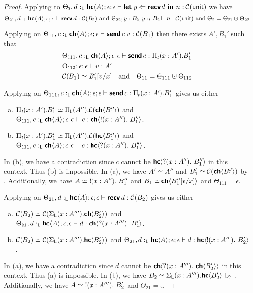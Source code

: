 \begin{proof}
  \noindent
  Applying  to
  $\Theta_2, d :_{\textsf{L}} {\textbf{\textsf{hc}}\langle{A}\rangle} ; \epsilon ; \epsilon \vdash \textbf{\textsf{let}}\;{y}\Leftarrow{\textbf{\textsf{recv}}\,{d}}\textbf{\textsf{ in }}{n} : \mathcal{C}({\textsf{unit}})$
  we have
  $$
    \Theta_{21}, d \tL \HC{A} ; \epsilon ; \epsilon \vdash \recvR{d} : \CM{B_2}
    \text{ and }
    \Theta_{22}  ; y : B_2 ; y :_t B_2 \vdash n : \CM{\unit}
    \text{ and } {\Theta_2 = \Theta_{21} \dotcup \Theta_{22}}
  $$

  \noindent
  Applying  on
  $\Theta_{11}, c :_{\textsf{L}} {\textbf{\textsf{ch}}\langle{A}\rangle} ; \epsilon ; \epsilon \vdash {\textbf{\textsf{send}}\,{c}}\;{v} : \mathcal{C}({B_1})$
  then there exists $A', B_1'$ such that
  \begin{align*}
    & \Theta_{111}, c \tL \CH{A} ; \epsilon ; \epsilon \vdash \sendR{c} : \PiR{t}{x : A'}{B_1'} \\
    & \Theta_{112} ; \epsilon ; \epsilon \vdash v : A' \\
    & \CM{B_1} \simeq B_1'[v/x] \quad\text{and}\quad \Theta_{11} = \Theta_{111} \dotcup \Theta_{112}
  \end{align*}

  \noindent
  Applying  on
  $\Theta_{111}, c :_{\textsf{L}} {\textbf{\textsf{ch}}\langle{A}\rangle} ; \epsilon ; \epsilon \vdash \textbf{\textsf{send}}\,{c} : \Pi_{t}({x : A'}).{B_1'}$
  gives us either
  \begin{enumerate}[(a)]
    \item $\Pi_{t}({x : A'}).{B_1'} \simeq \Pi_{\textsf{L}}({A''}).{\mathcal{C}({{\textbf{\textsf{ch}}\langle{B_1''}\rangle}})}$ and
          $\Theta_{111}, c :_{\textsf{L}} {\textbf{\textsf{ch}}\langle{A}\rangle} ; \epsilon ; \epsilon \vdash c : {\textbf{\textsf{ch}}\langle{{{!}({x : A''}).\ {B_1''}}}\rangle}$.
    \item $\Pi_{t}({x : A'}).{B_1'} \simeq \Pi_{\textsf{L}}({A''}).{\mathcal{C}({{\textbf{\textsf{hc}}\langle{B_1''}\rangle}})}$ and
          $\Theta_{111}, c :_{\textsf{L}} {\textbf{\textsf{ch}}\langle{A}\rangle} ; \epsilon ; \epsilon \vdash c : {\textbf{\textsf{hc}}\langle{{{?}({x : A''}).\ {B_1''}}}\rangle}$.
  \end{enumerate}
  In (b), we have a contradiction since $c$ cannot be ${\textbf{\textsf{hc}}\langle{{{?}({x : A''}).\ {B_1''}}}\rangle}$ in this context.
  Thus (b) is impossible. In (a), we have $A' \simeq A''$ and $B_1' \simeq \mathcal{C}({{\textbf{\textsf{ch}}\langle{B_1''}\rangle}})$ by .
  Additionally, we have $A \simeq {{!}({x : A''}).\ {B_1''}}$ and $B_1 \simeq {\textbf{\textsf{ch}}\langle{B_1''[v/x]}\rangle}$ and $\Theta_{111} = \epsilon$.

  \noindent
  Applying  on
  $\Theta_{21}, d :_{\textsf{L}} {\textbf{\textsf{hc}}\langle{A}\rangle} ; \epsilon ; \epsilon \vdash \textbf{\textsf{recv}}\,{d} : \mathcal{C}({B_2})$
  gives us either
  \begin{enumerate}[(a)]
    \item $\mathcal{C}({B_2}) \simeq \mathcal{C}({\Sigma_{\textsf{L}}({x : A'''}).{{\textbf{\textsf{ch}}\langle{B_2'}\rangle}}})$ and
          $\Theta_{21}, d :_{\textsf{L}} {\textbf{\textsf{hc}}\langle{A}\rangle} ; \epsilon ; \epsilon \vdash d : {\textbf{\textsf{ch}}\langle{{{?}({x : A'''}).\ {B_2'}}}\rangle}$.
    \item $\mathcal{C}({B_2}) \simeq \mathcal{C}({\Sigma_{\textsf{L}}({x : A'''}).{{\textbf{\textsf{hc}}\langle{B_2'}\rangle}}})$ and
          $\Theta_{21}, d :_{\textsf{L}} {\textbf{\textsf{hc}}\langle{A}\rangle} ; \epsilon ; \epsilon \vdash d : {\textbf{\textsf{hc}}\langle{{{!}({x : A'''}).\ {B_2'}}}\rangle}$.
  \end{enumerate}
  In (a), we have a contradiction since $d$ cannot be ${\textbf{\textsf{ch}}\langle{{{?}({x : A'''}).\ {{\textbf{\textsf{ch}}\langle{B_2'}\rangle}}}}\rangle}$ in this context.
  Thus (a) is impossible. In (b), we have $B_2 \simeq \Sigma_{\textsf{L}}({x : A'''}).{{\textbf{\textsf{hc}}\langle{B_2'}\rangle}}$ by .
  Additionally, we have $A \simeq {{!}({x : A'''}).\ {B_2'}}$ and $\Theta_{21} = \epsilon$.


\end{proof}
